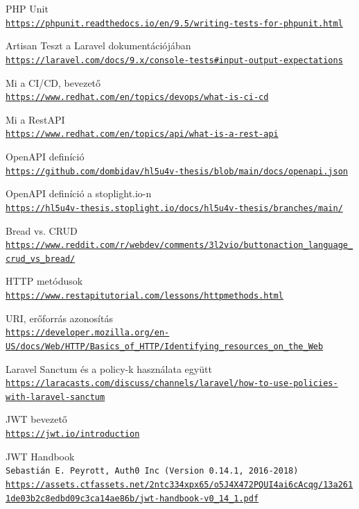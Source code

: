 \documentclass[a4paper,12pt]{thesis-ekf}
\theoremstyle{definition}
\begin{document}
\begin{thebibliography}{2}
    PHP Unit
    \\\texttt{\url{https://phpunit.readthedocs.io/en/9.5/writing-tests-for-phpunit.html}}
    
    Artisan Teszt a Laravel dokumentációjában
    \\\texttt{\url{https://laravel.com/docs/9.x/console-tests\#input-output-expectations}}
    
    Mi a CI/CD, bevezető
    \\\texttt{\url{https://www.redhat.com/en/topics/devops/what-is-ci-cd}}
    
    Mi a RestAPI
    \\\texttt{\url{https://www.redhat.com/en/topics/api/what-is-a-rest-api}}
    
    OpenAPI definíció
    \\\texttt{\url{https://github.com/dombidav/hl5u4v-thesis/blob/main/docs/openapi.json}}
    
    
    OpenAPI definíció a stoplight.io-n
    \\\texttt{\url{https://hl5u4v-thesis.stoplight.io/docs/hl5u4v-thesis/branches/main/}}
    
    Bread vs. CRUD
    \\\texttt{\url{https://www.reddit.com/r/webdev/comments/3l2vio/buttonaction_language_crud_vs_bread/}}
    
    HTTP metódusok
    \\\texttt{\url{https://www.restapitutorial.com/lessons/httpmethods.html}}
    
    URI, erőforrás azonosítás
    \\\texttt{\url{https://developer.mozilla.org/en-US/docs/Web/HTTP/Basics_of_HTTP/Identifying_resources_on_the_Web}}
    
    Laravel Sanctum és a policy-k használata együtt
    \\\texttt{\url{https://laracasts.com/discuss/channels/laravel/how-to-use-policies-with-laravel-sanctum}}
    
    JWT bevezető
    \\\texttt{\url{https://jwt.io/introduction}}
    
    JWT Handbook
    \\\texttt{Sebastián E. Peyrott, Auth0 Inc (Version 0.14.1, 2016-2018)}
    \\\texttt{\url{https://assets.ctfassets.net/2ntc334xpx65/o5J4X472PQUI4ai6cAcqg/13a2611de03b2c8edbd09c3ca14ae86b/jwt-handbook-v0_14_1.pdf}}
    

\end{thebibliography}
\end{document}
